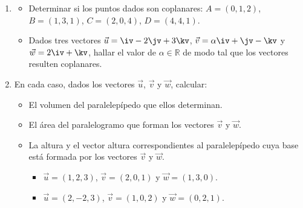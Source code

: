 \begin{enumerate}[\hspace{-3mm}$1)$]
\item \begin{itemize}
\item[a)] Determinar si los puntos dados son coplanares: $A=(0,1,2)$, $B=(1,3,1)$, $C=(2,0,4)$, $D=(4,4,1)$.
\item[b)] Dados tres vectores $\vec u=\iv-2\jv+3\kv$, $\vec v=\alpha\iv+\jv-\kv$ y $\vec w=2\iv+\kv$, hallar el valor de $\alpha\in\mathbb{R}$ de modo tal que los vectores resulten coplanares.
\end{itemize}

\item En cada caso, dados los vectores $\vec u$, $\vec v$ y $\vec w$, calcular:
\begin{itemize}
\item[a)] El volumen del paralelepípedo que ellos determinan.
\item[b)] El área del paralelogramo que forman los vectores $\vec v$ y $\vec w$.
\item[c)] La altura y el vector altura correspondientes al paralelepípedo cuya base está formada por los vectores $\vec v$ y $\vec w$.
\begin{itemize}
\item[i)] $\vec u=(1,2,3)$, $\vec v=(2,0,1)$ y $\vec w=(1,3,0)$.
\item[ii)] $\vec u=(2,-2,3)$, $\vec v=(1,0,2)$ y $\vec w=(0,2,1)$.
\end{itemize}
\end{itemize}

\end{enumerate}

